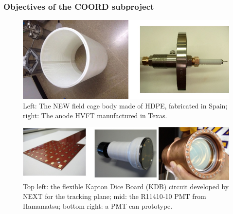 %
%

\subsubsection*{Objectives of the COORD subproject}


\begin{figure}[t!b!]
\begin{center}
\includegraphics[width=.9\textwidth]{img/FC3.jpg}
\end{center}
\caption{Left: The NEW field cage body made of HDPE, fabricated in Spain; right: The anode HVFT manufactured in Texas.
} \label{fig:FC}
\end{figure}

\begin{figure}[t!b!]
\begin{center}
\includegraphics[width=.9\textwidth]{img/KDBandPMT.jpg}
\end{center}
\caption{Top left: the flexible Kapton Dice Board (KDB) circuit developed by NEXT for the tracking plane; mid: the R11410-10 PMT from Hamamatsu; bottom right: a PMT can prototype.} \label{fig:sensors}
\end{figure}

